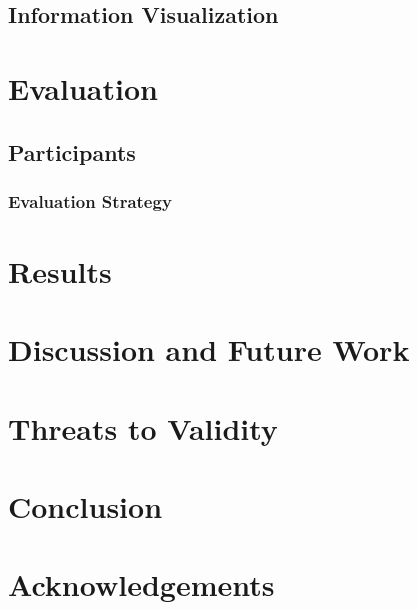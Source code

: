 \documentclass[conference]{IEEEtran}
\begin{document}
\subsection{Information Visualization}



\section{Evaluation}

\subsection{Participants}

\subsubsection{Evaluation Strategy}



\section{Results}



\section{Discussion and Future Work}



\section{Threats to Validity}



\section{Conclusion}



\section{Acknowledgements}






\end{document}
